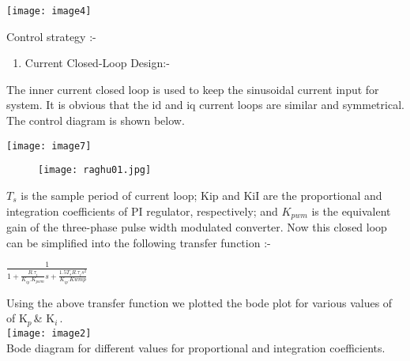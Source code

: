 \documentclass{article} %
\begin{document}
\noindent \texttt{[image: image4]}

\noindent 


\Large\noindent Control strategy :- 

\begin{enumerate}
\item  Current Closed-Loop Design:- 
\end{enumerate}

\noindent The inner current closed loop is used to keep the sinusoidal current input for system. It is obvious that the id and iq current loops are similar and symmetrical. The control diagram is shown below.\\
\begin{center}
\noindent \texttt{[image: image7]}



\end{center}

\begin{figure}
\texttt{[image: raghu01.jpg]}
\end{figure}







\noindent  $T_s$ is the sample period of current loop; Kip and KiI are the proportional and integration coefficients of PI regulator, respectively; and $K_{pwm}$ is the equivalent gain of the three-phase pulse width modulated converter.
\noindent Now this closed loop can be  simplified into the following  transfer function :- \\
\begin{center}

$\frac{1}{{1+{\frac{R.\tau_i}{K_{ip}. K_{pwm}}}}s+{\frac{1.5 T_sR. \tau_i s^{2}}{K_{ip}. K{wmp}}}}$\\
 \end{center}
 


\noindent 

\noindent Using the above transfer function we plotted the bode plot for various values of of K${}_{p\ }$\& K${}_{i\ }$.\\

\noindent \texttt{[image: image2]}\\
Bode diagram for different values for proportional and integration coefficients. \\
\end{document}
